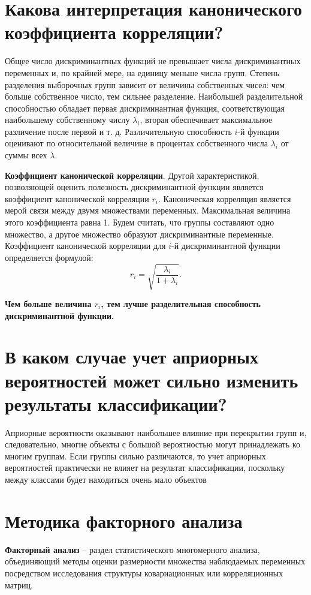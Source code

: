 \documentclass[a4paper, 12pt]{article}
\begin{document}
\section{Какова интерпретация канонического коэффициента корреляции?}
Общее число дискриминантных функций не превышает числа дискриминантных переменных и, по крайней мере, на единицу меньше числа групп. Степень разделения выборочных групп зависит от величины собственных чисел: чем больше собственное число, тем сильнее разделение. Наибольшей разделительной способностью обладает первая дискриминантная функция, соответствующая наибольшему собственному числу $\lambda_i$, вторая обеспечивает максимальное различение после первой и т. д. Различительную способность $i$-й функции оценивают по относительной величине в процентах собственного числа  $\lambda_i$ от суммы всех  $\lambda$.

\textbf{Коэффициент канонической корреляции}. Другой характеристикой, позволяющей оценить полезность дискриминантной функции является коэффициент канонической корреляции  $r_i$. Каноническая корреляция является мерой связи между двумя множествами переменных. Максимальная величина этого коэффициента равна 1. Будем считать, что группы составляют одно множество, а другое множество образуют дискриминантные переменные. Коэффициент канонической корреляции для $i$-й дискриминантной функции определяется формулой: $$r_i = \sqrt{\dfrac{\lambda_i}{1+\lambda_i}}.$$

\textbf{Чем больше величина  $r_i$, тем лучше разделительная способность дискриминантной функции.}

\section{В каком случае учет априорных вероятностей может сильно изменить результаты классификации?}
Априорные вероятности оказывают наибольшее влияние при перекрытии групп и, следовательно, многие объекты с большой вероятностью могут принадлежать ко многим группам. Если группы сильно различаются, то учет априорных вероятностей практически не влияет на результат классификации, поскольку между классами будет находиться очень мало объектов
\section{Методика факторного анализа}

\textbf{Факторный анализ} -- раздел статистического многомерного анализа, объединяющий методы оценки размерности множества наблюдаемых переменных посредством исследования структуры ковариационных или корреляционных матриц.
\end{document}
